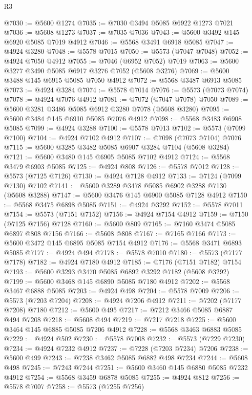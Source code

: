 \begin{lexlean}{R3}
\begin{coremodule}
@7030 := @5600 @1274
@7035 := @7030 @3494 @5085 @6922 @1273 @7021
@7036 := @5608 @1273
@7037 := @7035 @7036
@7043 := @5600 @3492 @145 @6920 @5085 @7019 @4912
@7046 := @5568 @3491 @6918 @5085
@7047 := @4924 @3280
@7048 := @5578 @7015
@7050 := @5573 (@7047 @7048)
@7052 := @4924 @7050 @4912
@7055 := @7046 (@6952 @7052) @7019
@7063 := @5600 @3277 @3490 @5085 @6917 @3276 @7052 (@5608 @3276)
@7069 := @5600 @3488 @145 @6915 @5085 @7050 @4912
@7072 := @5568 @3487 @6913 @5085
@7073 := @4924 @3284
@7074 := @5578 @7014
@7076 := @5573 (@7073 @7074)
@7078 := @4924 @7076 @4912
@7081 := @7072 (@7047 @7078) @7050
@7089 := @5600 @3281 @3486 @5085 @6912 @3280 @7078 (@5608 @3280)
@7095 := @5600 @3484 @145 @6910 @5085 @7076 @4912
@7098 := @5568 @3483 @6908 @5085
@7099 := @4924 @3288
@7100 := @5578 @7013
@7102 := @5573 (@7099 @7100)
@7104 := @4924 @7102 @4912
@7107 := @7098 (@7073 @7104) @7076
@7115 := @5600 @3285 @3482 @5085 @6907 @3284 @7104 (@5608 @3284)
@7121 := @5600 @3480 @145 @6905 @5085 @7102 @4912
@7124 := @5568 @3479 @6903 @5085
@7125 := @4924 @808
@7126 := @5578 @7012
@7128 := @5573 (@7125 @7126)
@7130 := @4924 @7128 @4912
@7133 := @7124 (@7099 @7130) @7102
@7141 := @5600 @3289 @3478 @5085 @6902 @3288 @7130 (@5608 @3288)
@7147 := @5600 @3476 @145 @6900 @5085 @7128 @4912
@7150 := @5568 @3475 @6898 @5085
@7151 := @4924 @3292
@7152 := @5578 @7011
@7154 := @5573 (@7151 @7152)
@7156 := @4924 @7154 @4912
@7159 := @7150 (@7125 @7156) @7128
@7160 := @5600 @809
@7165 := @7160 @3474 @5085 @6897 @808 @7156
@7166 := @5608 @808
@7167 := @7165 @7166
@7173 := @5600 @3472 @145 @6895 @5085 @7154 @4912
@7176 := @5568 @3471 @6893 @5085
@7177 := @4924 @494
@7178 := @5578 @7010
@7180 := @5573 (@7177 @7178)
@7182 := @4924 @7180 @4912
@7185 := @7176 (@7151 @7182) @7154
@7193 := @5600 @3293 @3470 @5085 @6892 @3292 @7182 (@5608 @3292)
@7199 := @5600 @3468 @145 @6890 @5085 @7180 @4912
@7202 := @5568 @3467 @6888 @5085
@7203 := @4924 @498
@7204 := @5578 @7009
@7206 := @5573 (@7203 @7204)
@7208 := @4924 @7206 @4912
@7211 := @7202 (@7177 @7208) @7180
@7212 := @5600 @495
@7217 := @7212 @3466 @5085 @6887 @494 @7208
@7218 := @5608 @494
@7219 := @7217 @7218
@7225 := @5600 @3464 @145 @6885 @5085 @7206 @4912
@7228 := @5568 @3463 @6883 @5085
@7229 := @4924 @502
@7230 := @5578 @7008
@7232 := @5573 (@7229 @7230)
@7234 := @4924 @7232 @4912
@7237 := @7228 (@7203 @7234) @7206
@7238 := @5600 @499
@7243 := @7238 @3462 @5085 @6882 @498 @7234
@7244 := @5608 @498
@7245 := @7243 @7244
@7251 := @5600 @3460 @145 @6880 @5085 @7232 @4912
@7254 := @5568 @3459 @6878 @5085
@7255 := @4924 @812
@7256 := @5578 @7007
@7258 := @5573 (@7255 @7256)

\end{coremodule}
\end{lexlean}
